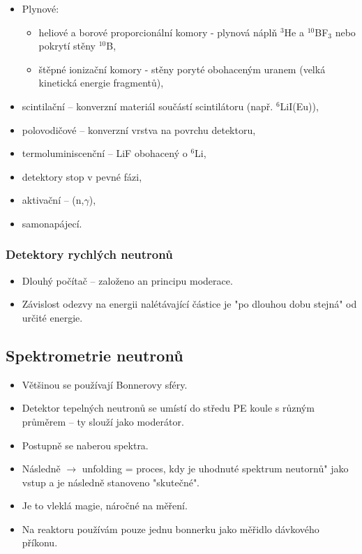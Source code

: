 \begin{itemize}
    \item Plynové:
    \begin{itemize}
        \item heliové a borové proporcionální komory - plynová náplň $^{3}$He a $^{10}$BF$_3$ nebo pokrytí stěny $^{10}$B,
        \item štěpné ionizační komory - stěny poryté obohaceným uranem (velká kinetická energie fragmentů),
    \end{itemize}
    \item scintilační -- konverzní materiál součástí scintilátoru (např. $^{6}$LiI(Eu)),
    \item polovodičové -- konverzní vrstva na povrchu detektoru,
    \item termoluminiscenční -- LiF obohacený o $^{6}$Li,
    \item detektory stop v pevné fázi,
    \item aktivační -- (n,$\gamma$),
    \item samonapájecí.
\end{itemize}

\subsubsection{Detektory rychlých neutronů}

\begin{itemize}
    \item Dlouhý počítač -- založeno an principu moderace.
    \item Závislost odezvy na energii nalétávající částice je "po dlouhou dobu stejná" od určité energie.
\end{itemize}

\subsection{Spektrometrie neutronů}

\begin{itemize}
    \item Většinou se používají Bonnerovy sféry.
    \item Detektor tepelných neutronů se umístí do středu PE koule s různým průměrem -- ty slouží jako moderátor.
    \item Postupně se naberou spektra.
    \item Následně $\rightarrow$ unfolding = proces, kdy je uhodnuté spektrum neutornů" jako vstup a je následně stanoveno "skutečné".
    \item Je to vleklá magie, náročné na měření.
    \item Na reaktoru používám pouze jednu bonnerku jako měřidlo dávkového příkonu.
\end{itemize}


